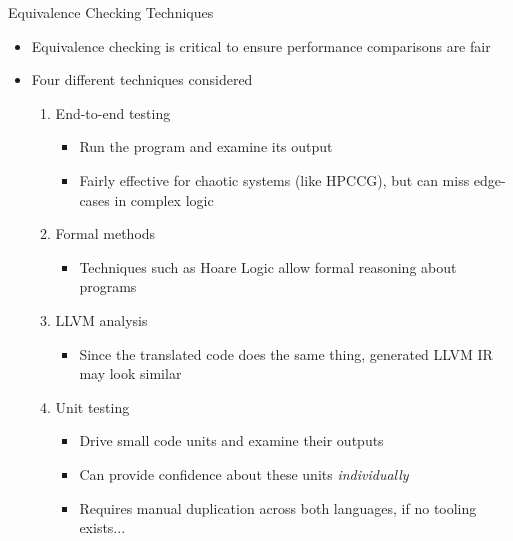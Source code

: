 \documentclass[10pt,aspectratio=169]{beamer}
\begin{document}
\begin{frame}{Equivalence Checking Techniques}
    \begin{itemize}
        \item Equivalence checking is critical to ensure performance comparisons are fair
        \item Four different techniques considered
        \begin{enumerate}
            \item<1-> \alert<5>{End-to-end testing}
            \begin{itemize}
                \item Run the program and examine its output
                \item Fairly effective for chaotic systems (like HPCCG), but can miss edge-cases in complex logic %
            \end{itemize}
            \item<2-> Formal methods
            \begin{itemize}
                \item Techniques such as Hoare Logic \cite{hoareAxiomaticBasisComputer1969} allow formal reasoning about programs
            \end{itemize}
            \item<3-> LLVM analysis
            \begin{itemize}
                \item Since the translated code does the same thing, generated LLVM IR may look similar
            \end{itemize}
            \item<4-> \alert<5>{Unit testing}
            \begin{itemize}
                \item Drive small code units and examine their outputs
                \item Can provide confidence about these units \textit{individually}
                \item Requires manual duplication across both languages, if no tooling exists...
            \end{itemize}
        \end{enumerate}
    \end{itemize}
\end{frame}
\end{document}
